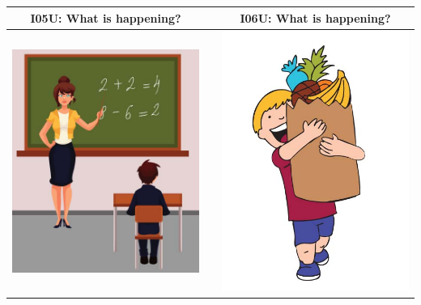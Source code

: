 \documentclass[12pt,notitlepage]{article}
\begin{document}
\begin{center}
\begin{tabular}{|c|c|c|}
\hline
I05U: What is happening? && I06U: What is happening? \\
\hline
\includegraphics[width=20em,trim=0 0 0 -3]{figures/I05.jpg} & & \includegraphics[width=20em,trim=0 0 0 -3]{figures/I06.jpg} \\
\hline
\end{tabular}
\vspace{1em} \\



\end{center}
\end{document}
